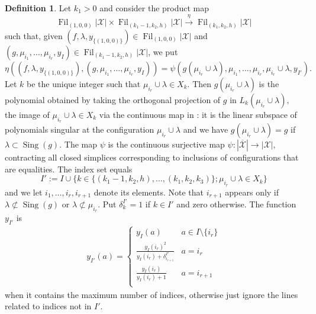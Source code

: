 \documentclass[10pt,a4paper,twoside]{amsart}
\theoremstyle{plain}
\theoremstyle{definition}
\newtheorem{defin}{Definition}
\theoremstyle{remark}
\begin{document}
\begin{defin}\label{def:prod}
    Let $k_1>0$ and consider the product map $$\operatorname{Fil}_{{(1,0,0)}}|\mathcal{X}|\times\operatorname{Fil}_{{(k_1-1,k_2,h)}}|\mathcal{X}|\xrightarrow{\eta}\operatorname{Fil}_{{(k_1,k_2,h)}}|\mathcal{X}|$$
    such that, given $(f,\lambda, y_{\{(1,0,0)\}}) \in \operatorname{Fil}_{(1,0,0)}|\mathcal{X}|$ and $(g,\mu_{i_1},\dots,\mu_{i_r}, y_{I}) \in \operatorname{Fil}_{(k_1-1,k_2,h)}|\mathcal{X}|$, we put 
\begin{equation}\label{eq:eta}
\eta((f,\lambda, y_{\{(1,0,0)\}}),(g,\mu_{i_1},\dots,\mu_{i_r}, y_{I}))=
\psi(g(\mu_{i_r}\cup\lambda),\mu_{i_1},\dots,\mu_{i_r},\mu_{i_r}\cup\lambda,y_{I'}).
\end{equation}
Let $k$ be the unique integer such that $\mu_{i_r}\cup\lambda\in X_k$. Then $g(\mu_{i_r}\cup\lambda)$ is the polynomial obtained by taking the orthogonal projection of $g$ in $L_k(\mu_{i_r}\cup\lambda),$ the image of $\mu_{i_r}\cup\lambda\in X_k$ via the continuous map in \cite[List 2.3 (5)]{TomM4}: it is the linear subspace of polynomials singular at the configuration $\mu_{i_r}\cup\lambda$ 
and we have $g(\mu_{i_r}\cup\lambda)=g$ if $\lambda\subset\operatorname{Sing}(g).$
The map $\psi$ is the continuous surjective map
$\psi:|\overline{\mathcal{X}}|\rightarrow{|\mathcal{X}|},$ contracting all closed simplices corresponding to inclusions of configurations that are equalities. 
The index set equals 
$$I':=I\cup\{k\in \{(k_1-1,k_2,h),\dots,(k_1,k_2,k_3)\};\mu_{i_r}\cup\lambda\in X_k\}$$
and we let $i_1,\dots,i_r,i_{r+1}$ 
denote its elements. Note that $i_{r+1}$ appears only if $\lambda\not\subset\operatorname{Sing}(g)$ or $\lambda\not\subset\mu_{i_r}.$
Put $\delta_{k}^{I'}=1$ if $k\in I'$ and zero otherwise. The function $y_{I'}$ is 
\begin{align}\label{def:y_I}
y_{I'}(a)=\begin{cases}
y_{I}(a)&a\in I\setminus\{i_r\}\\
\frac{y_I(i_r)^2}{y_I(i_r)+\delta_{i_{r+1}}^{I'}}&a=i_{r}\\
\frac{y_I(i_r)}{y_I(i_r)+1}&a=i_{r+1}\\
\end{cases}
\end{align}
when it contains the maximum number of indices, otherwise just ignore the lines related to indices not in $I'$.


\end{defin}
\end{document}
